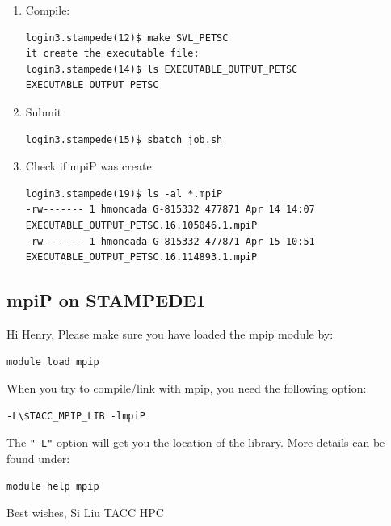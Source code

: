 \documentclass{article}
\begin{document}
\begin{enumerate}
\begin{enumerate}
\begin{verbatim}
\end{verbatim}
\normalsize
\item Compile:
\scriptsize
\begin{verbatim}
login3.stampede(12)$ make SVL_PETSC
it create the executable file:
login3.stampede(14)$ ls EXECUTABLE_OUTPUT_PETSC
EXECUTABLE_OUTPUT_PETSC
\end{verbatim}
\normalsize
\item Submit
\scriptsize
\begin{verbatim}
login3.stampede(15)$ sbatch job.sh 
\end{verbatim}
\normalsize
\item  Check if mpiP was create
\scriptsize
\begin{verbatim}
login3.stampede(19)$ ls -al *.mpiP
-rw------- 1 hmoncada G-815332 477871 Apr 14 14:07 EXECUTABLE_OUTPUT_PETSC.16.105046.1.mpiP
-rw------- 1 hmoncada G-815332 477871 Apr 15 10:51 EXECUTABLE_OUTPUT_PETSC.16.114893.1.mpiP
\end{verbatim}
\normalsize
\end{enumerate}
\end{enumerate}


\subsection{mpiP on STAMPEDE1}       
Hi Henry, Please make sure you have loaded the mpip module by:
\scriptsize
\begin{verbatim}
module load mpip
\end{verbatim}
\normalsize
When you try to compile/link with mpip, you need the following option:
\scriptsize
\begin{verbatim}
-L\$TACC_MPIP_LIB -lmpiP
\end{verbatim}
\normalsize
The \verb+"-L"+ option will get you the location of the library. More details can be found under:
\scriptsize
\begin{verbatim}
module help mpip
\end{verbatim}
\normalsize
Best wishes, Si Liu TACC HPC
\end{document}
